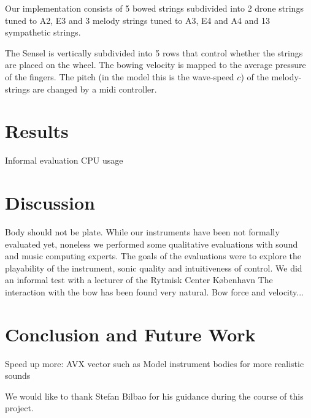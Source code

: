 \documentclass{article}
\begin{document}
Our implementation consists of 5 bowed strings subdivided into 2 drone strings tuned to A2, E3 and 3 melody strings tuned to A3, E4 and A4 and 13 sympathetic strings. 

The Sensel is vertically subdivided into 5 rows that control whether the strings are placed on the wheel. The bowing velocity is mapped to the average pressure of the fingers. The pitch (in the model this is the wave-speed $c$) of the melody-strings are changed by a midi controller.

\section{Results}
Informal evaluation
CPU usage

\section{Discussion}\label{sec:discussion}

Body should not be plate.
While our instruments have been not formally evaluated yet, noneless we performed some qualitative evaluations with sound and music computing experts.
The goals of the evaluations were to explore the playability of the instrument, sonic quality and intuitiveness of control.
We did an informal test with a lecturer of the Rytmisk Center København 
The interaction with the bow has been found very natural. Bow force and velocity... 

\section{Conclusion and Future Work}\label{sec:conclusion}
Speed up more: AVX vector such as \cite{Webb2015}
Model instrument bodies for more realistic sounds


\begin{acknowledgments}
We would like to thank Stefan Bilbao for his guidance during the course of this project. 
\end{acknowledgments} 


\end{document}
